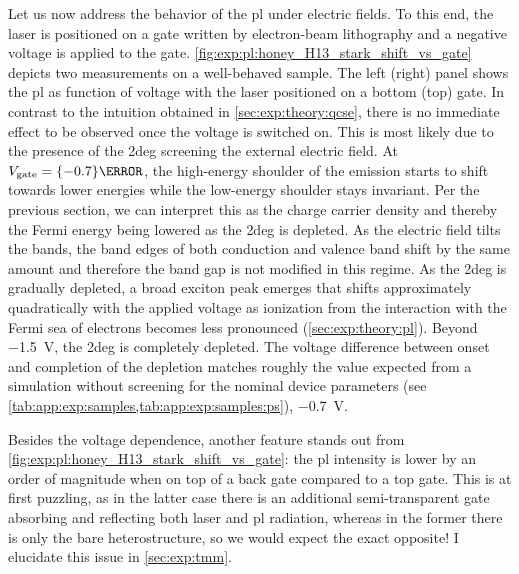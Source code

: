 Let us now address the behavior of the \gls{pl} under electric fields.
To this end, the laser is positioned on a gate written by electron-beam lithography and a negative voltage is applied to the gate.
\cref{fig:exp:pl:honey_H13_stark_shift_vs_gate} depicts two measurements on a well-behaved sample.
The left (right) panel shows the \gls{pl} as function of voltage with the laser positioned on a bottom (top) gate.
In contrast to the intuition obtained in \cref{sec:exp:theory:qcse}, there is no immediate effect to be observed once the voltage is switched on.
This is most likely due to the presence of the \gls{2deg} screening the external electric field. %
At $V_{\mr{gate}} = \qty{-0.7}{\volt}$, the high-energy shoulder of the emission starts to shift towards lower energies while the low-energy shoulder stays invariant.
Per the previous section, we can interpret this as the charge carrier density and thereby the Fermi energy being lowered as the \gls{2deg} is depleted.
As the electric field tilts the bands, the band edges of both conduction and valence band shift by the same amount and therefore the band gap is not modified in this regime.
As the \gls{2deg} is gradually depleted, a broad exciton peak emerges that shifts approximately quadratically with the applied voltage as ionization from the interaction with the Fermi sea of electrons becomes less pronounced (\cf \cref{sec:exp:theory:pl}).
Beyond \qty{-1.5}{\volt}, the \gls{2deg} is completely depleted.
The voltage difference between onset and completion of the depletion matches roughly the value expected from a simulation without screening for the nominal device parameters (see \cref{tab:app:exp:samples,tab:app:exp:samples:ps}), \qty{-0.7}{\volt}.

Besides the voltage dependence, another feature stands out from \cref{fig:exp:pl:honey_H13_stark_shift_vs_gate}: the \gls{pl} intensity is lower by an order of magnitude when on top of a back gate compared to a top gate.
This is at first puzzling, as in the latter case there is an additional semi-transparent gate
absorbing and reflecting both laser and \gls{pl} radiation, whereas in the former there is only the bare heterostructure, so we would expect the exact opposite!
I elucidate this issue in \cref{sec:exp:tmm}.


